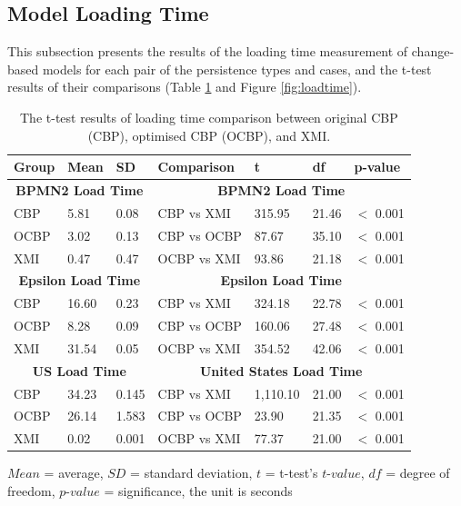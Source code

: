 \documentclass{llncs}
\begin{document}
{\vspace{-10pt}
\subsection{Model Loading Time}
\label{subsec:loading_time_test}

\vspace{-10pt}
 This subsection presents the results of the loading time measurement of change-based models for each pair of the persistence types and cases, and the t-test results of their comparisons (Table \ref{table:ttest_results_loadtime} and Figure \ref{fig:loadtime}). 
 
 \vspace{-20pt}
 \begin{table}[ht]
     \footnotesize
     \centering
     \caption{The t-test results of loading time comparison between original CBP (CBP), optimised CBP (OCBP), and XMI.}
     \label{table:ttest_results_loadtime}
     \begin{tabular}
         {|p{}p{}p{}|p{}p{}p{}p{}|}
         \hline 
         Group & Mean & SD & Comparison & t  & df & p-value \\  
         \hline 
         \multicolumn{3}{|c|}{\textbf{BPMN2 Load Time}} & \multicolumn{4}{c|}{\textbf{BPMN2 Load Time}} \\ 
         CBP & 5.81 & 0.08 & CBP vs XMI & 315.95    &21.46 & $<$ 0.001 \\  
         OCBP & 3.02 & 0.13 & CBP vs OCBP & 87.67 & 35.10  & $<$ 0.001 \\  
         XMI & 0.47 & 0.47 & OCBP vs XMI & 93.86    & 21.18  & $<$ 0.001 \\ 
         \hline 
         
         \multicolumn{3}{|c|}{\textbf{Epsilon Load Time}} & \multicolumn{4}{c|}{\textbf{Epsilon Load Time}} \\
         CBP & 16.60    & 0.23 &  CBP vs XMI & 324.18   &22.78 & $<$ 0.001 \\
         OCBP &  8.28  &  0.09 & CBP vs OCBP & 160.06 & 27.48 & $<$ 0.001 \\  
         XMI & 31.54   & 0.05 & OCBP vs XMI & 354.52   &42.06  & $<$ 0.001 \\ 
         \hline 
         
         \multicolumn{3}{|c|}{\textbf{US Load Time}} & \multicolumn{4}{c|}{\textbf{United States Load Time}} \\
         CBP & 34.23   & 0.145 & CBP vs XMI & 1,110.10   &21.00 & $<$ 0.001 \\ 
         OCBP & 26.14  & 1.583 & CBP vs OCBP &  23.90 &21.35 & $<$ 0.001 \\ 
         XMI &  0.02  & 0.001 & OCBP vs XMI & 77.37   & 21.00 & $<$ 0.001 \\ 
         \hline
     \end{tabular}
     \justify
     $Mean$ = average, $SD$ = standard deviation, $t$ = t-test's $t$-$value$, $df$ = degree of freedom, $p$-$value$ = significance, the unit is seconds
 \end{table}
 
}
\end{document}

